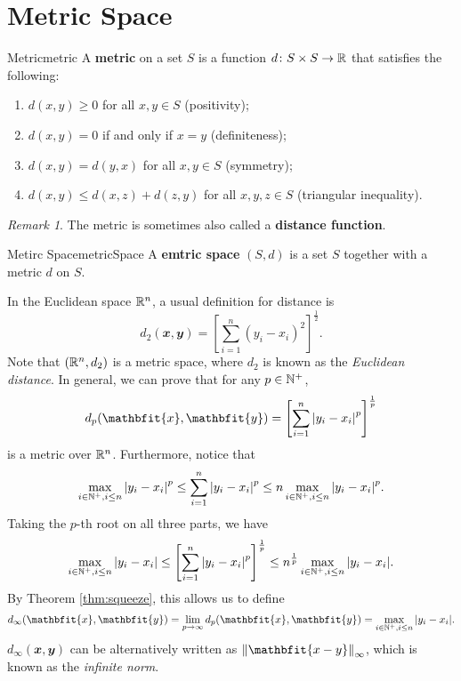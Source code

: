 \documentclass[math]{amznotes}
\theoremstyle{remark}
\newtheorem*{remark}{Remark}
\begin{document}
\section{Metric Space}
\begin{dfnbox}{Metric}{metric}
    A {\color{red} \textbf{metric}} on a set $S$ is a function $d \colon S \times S \to \mathbb{R}$ that satisfies the following:
    \begin{enumerate}
        \item $d(x, y) \geq 0$ for all $x, y \in S$ (positivity);
        \item $d(x, y) = 0$ if and only if $x = y$ (definiteness);
        \item $d(x, y) = d(y, x)$ for all $x, y \in S$ (symmetry);
        \item $d(x, y) \leq d(x, z) + d(z, y)$ for all $x, y, z \in S$ (triangular inequality).
    \end{enumerate}
\end{dfnbox}
\begin{notebox}
    \begin{remark}
        The metric is sometimes also called a {\color{red} \textbf{distance function}}.
    \end{remark}
\end{notebox}
\begin{dfnbox}{Metirc Space}{metricSpace}
    A {\color{red} \textbf{emtric space}} $(S, d)$ is a set $S$ together with a metric $d$ on $S$.    
\end{dfnbox}
In the Euclidean space $\mathbb{R}^n$, a usual definition for distance is
\begin{equation*}
    d_2(\mathbfit{x}, \mathbfit{y}) = \left[\sum_{i = 1}^{n}(y_i - x_i)^2\right]^{\frac{1}{2}}.
\end{equation*}
Note that $(\mathbb{R}^n, d_2)$ is a metric space, where $d_2$ is known as the \textit{Euclidean distance}. In general, we can prove that for any $p \in \mathbb{N}^+$,
\begin{equation*}
    d_p(\mathbfit{x}, \mathbfit{y}) = \left[\sum_{i = 1}^{n}\abs{y_i - x_i}^p\right]^{\frac{1}{p}}
\end{equation*}
is a metric over $\mathbb{R}^n$. Furthermore, notice that
\begin{equation*}
    \max_{i \in \mathbb{N}^+, i \leq n}{\left\lvert {y_i - x_i} \right\rvert}^p \leq \sum_{i = 1}^{n}{\left\lvert {y_i - x_i} \right\rvert}^p \leq n\max_{i \in \mathbb{N}^+, i \leq n}{\left\lvert {y_i - x_i} \right\rvert}^p.
\end{equation*}
Taking the $p$-th root on all three parts, we have
\begin{equation*}
    \max_{i \in \mathbb{N}^+, i \leq n}{\left\lvert {y_i - x_i} \right\rvert} \leq \left[\sum_{i = 1}^{n}{\left\lvert {y_i - x_i} \right\rvert}^p\right]^{\frac{1}{p}} \leq n^{\frac{1}{p}}\max_{i \in \mathbb{N}^+, i \leq n}{\left\lvert {y_i - x_i} \right\rvert}.
\end{equation*}
By Theorem \ref{thm:squeeze}, this allows us to define
\begin{equation*}
    d_\infty(\mathbfit{x}, \mathbfit{y}) = \lim_{p \to \infty}d_p(\mathbfit{x}, \mathbfit{y}) = \max_{i \in \N^+, i \leq n}\abs{y_i - x_i}.
\end{equation*}
$d_\infty(\mathbfit{x}, \mathbfit{y})$ can be alternatively written as $\norm{\mathbfit{x - y}}_\infty$, which is known as the \textit{infinite norm}.
\end{document}
